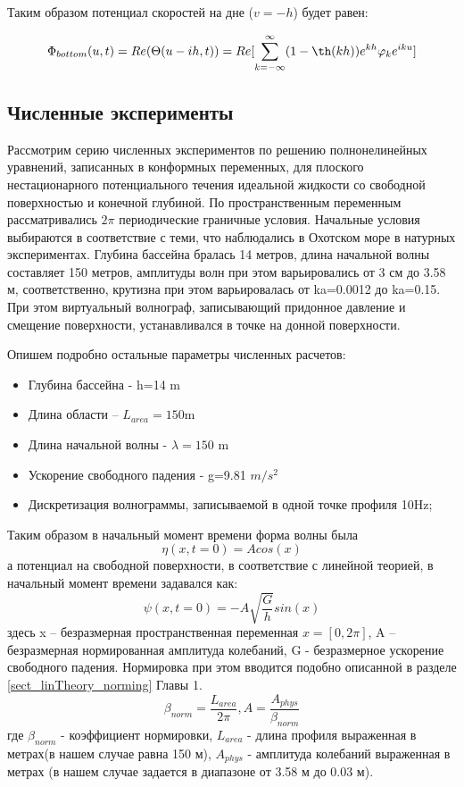 Таким образом потенциал скоростей на дне ($v=-h$) будет равен:

\begin{equation}\label{eq:PotentialBottom}
\Phi_{bottom}(u,t)=Re(\Theta(u-ih,t))=Re[\sum\limits_{k=-\infty}^{\infty}(1-\th(kh))e^{kh}\varphi_ke^{iku}]
\end{equation}

\subsection{Численные эксперименты }

Рассмотрим серию численных экспериментов по решению полнонелинейных уравнений, записанных в конформных переменных, для плоского нестационарного потенциального течения идеальной жидкости со свободной поверхностью и конечной глубиной. По пространственным переменным рассматривались $2\pi$ периодические граничные условия. Начальные условия выбираются в соответствие с теми, что наблюдались в Охотском море в натурных экспериментах. Глубина бассейна бралась 14 метров, длина начальной волны  составляет 150 метров, амплитуды волн при этом варьировались от 3 см до 3.58 м, соответственно, крутизна при этом варьировалась от ka=0.0012 до ka=0.15.  При этом виртуальный волнограф, записывающий придонное давление и смещение поверхности, устанавливался в точке на донной поверхности.

Опишем подробно остальные параметры численных расчетов:
\begin{itemize}
  \item Глубина бассейна - h=14 m
  \item Длина области – $L_{area}=150$m
  \item Длина начальной волны - $\lambda=150$ m
  \item Ускорение свободного падения - g=9.81 $m/s^2$
  \item Дискретизация волнограммы, записываемой в одной точке профиля 10Hz;
\end{itemize}

Таким образом в начальный момент времени форма волны была
\begin{equation}\label{eq:beginWave}
\eta(x,t=0)=Acos(x)
\end{equation}
а потенциал на свободной поверхности, в соответствие с линейной теорией, в начальный момент времени задавался как:
\begin{equation}\label{eq:beginPotential}
\psi(x,t=0)=-A\sqrt{\frac{G}{h}}sin(x)
\end{equation}
здесь x – безразмерная пространственная переменная $x=[0,2\pi]$, A – безразмерная нормированная амплитуда колебаний, G - безразмерное ускорение свободного падения. Нормировка при этом вводится подобно описанной в разделе \ref{sect_linTheory_norming} Главы 1.
\begin{equation}\label{eq:norming}
\beta_{norm}=\frac{L_{area}}{2\pi}, A=\frac{A_{phys}}{\beta_{norm}}
\end{equation}
где $\beta_{norm}$ - коэффициент нормировки,  $L_{area}$ - длина профиля выраженная в метрах(в нашем случае равна 150 м), $A_{phys}$ - амплитуда колебаний выраженная в метрах (в нашем случае задается в диапазоне от 3.58 м до 0.03 м).

